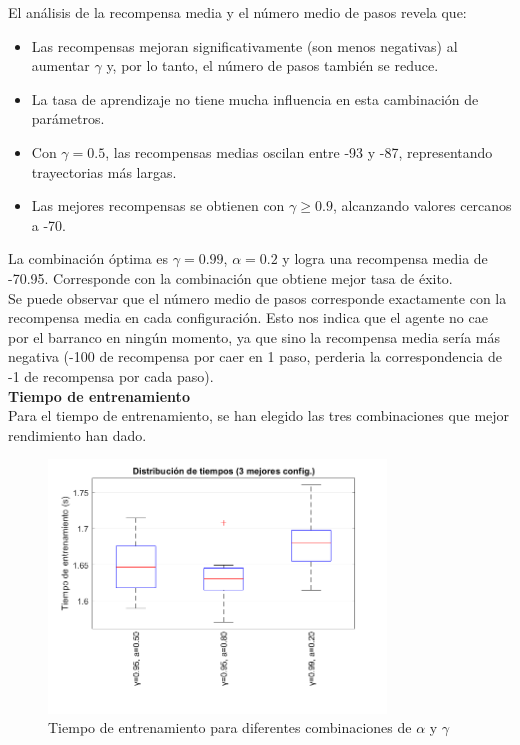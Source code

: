 El análisis de la recompensa media y el número medio de pasos revela que:

\begin{itemize}
    \item Las recompensas mejoran significativamente (son menos negativas) al aumentar $\gamma$ y, por lo tanto, el número de pasos también se reduce. 
    \item La tasa de aprendizaje no tiene mucha influencia en esta cambinación de parámetros. 
    \item Con $\gamma = 0.5$, las recompensas medias oscilan entre -93 y -87, representando trayectorias más largas.
    \item Las mejores recompensas se obtienen con $\gamma \geq 0.9$, alcanzando valores cercanos a -70.
\end{itemize}

La combinación óptima es $\gamma = 0.99$, $\alpha = 0.2$ y logra una recompensa media de -70.95. Corresponde con la combinación que obtiene mejor tasa de éxito. 
\\

Se puede observar que el número medio de pasos corresponde exactamente con la recompensa media en cada configuración. Esto nos indica que el agente no cae por el barranco en ningún momento, ya que sino la recompensa media sería más negativa (-100 de recompensa por caer en 1 paso, perderia la correspondencia de -1 de recompensa por cada paso).
\\

\textbf{Tiempo de entrenamiento}
\\

Para el tiempo de entrenamiento, se han elegido las tres combinaciones que mejor rendimiento han dado. 

\begin{figure}[H]
    \centering
    \includegraphics[width=0.8\textwidth]{../../experiments/qlearning/experiment-1/results/time.png}
    \caption{Tiempo de entrenamiento para diferentes combinaciones de $\alpha$ y $\gamma$}
    \label{fig:qlearning-time}
\end{figure}

